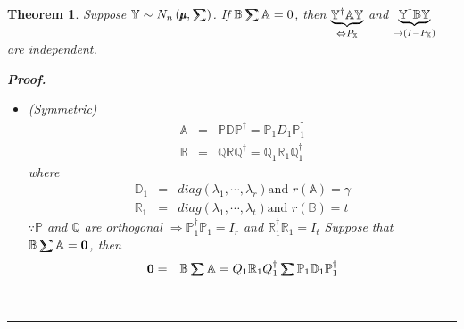 \documentclass{article}
\newtheorem{theorem}{Theorem}
\newenvironment{proof}[1][Proof]{\noindent\textbf{#1.} }{\ \rule{0.5em}{0.5em}}
\begin{document}
\begin{theorem}
Suppose $\mathbb{Y}\sim N_{n}\left( \mathbb{%
\mu\mkern-12.3mu\mu%
},%
\tsum\mkern-20mu\tsum%
\right) $. If $\mathbb{B}%
\tsum\mkern-20mu\tsum%
\mathbb{A}=0$, then $\underset{\Leftrightarrow P_{\mathbb{X}}}{\underbrace{%
\mathbb{Y}^{\dagger }\mathbb{AY}}}$ and $\underset{\rightarrow \left( I-P_{%
\mathbb{X}}\right) }{\underbrace{\mathbb{Y}^{\dagger }\mathbb{BY}}}$ are
independent.

\begin{proof}

\begin{itemize}
\item[Case 1] (Symmetric)%
\begin{eqnarray*}
\mathbb{A} &=&\mathbb{PDP}^{\dagger }=\mathbb{P}_{1}D_{1}\mathbb{P}%
_{1}^{\dagger } \\
\mathbb{B} &=&\mathbb{QRQ}^{\dagger }=\mathbb{Q}_{1}\mathbb{R}_{1}\mathbb{Q}%
_{1}^{\dagger }
\end{eqnarray*}%
where%
\begin{eqnarray*}
\mathbb{D}_{1} &=&diag\left( \lambda _{1},\cdots ,\lambda _{r}\right) \text{
and }r\left( \mathbb{A}\right) =\gamma \\
\mathbb{R}_{1} &=&diag\left( \lambda _{1},\cdots ,\lambda _{t}\right) \text{
and }r\left( \mathbb{B}\right) =t
\end{eqnarray*}%
$\because \mathbb{P}$ and $\mathbb{Q}$ are orthogonal\newline
\newline
$\Rightarrow \mathbb{P}_{1}^{\dagger }\mathbb{P}_{1}=I_{r}$ and $\mathbb{R}%
_{1}^{\dagger }\mathbb{R}_{1}=I_{t}$\newline
\newline
Suppose that $\mathbb{B}%
\tsum\mkern-20mu\tsum%
\mathbb{A}=\boldsymbol{0}$, then%
\begin{eqnarray*}
\boldsymbol{0} &=&\mathbb{B}%
\tsum\mkern-20mu\tsum%
\mathbb{A}=Q_{1}\mathbb{R}_{1}Q_{1}^{\dagger }%
\tsum\mkern-20mu\tsum%
\mathbb{P}_{1}\mathbb{D}_{1}\mathbb{P}_{1}^{\dagger } \\

\end{eqnarray*}
\end{itemize}
\end{proof}
\end{theorem}
\end{document}
